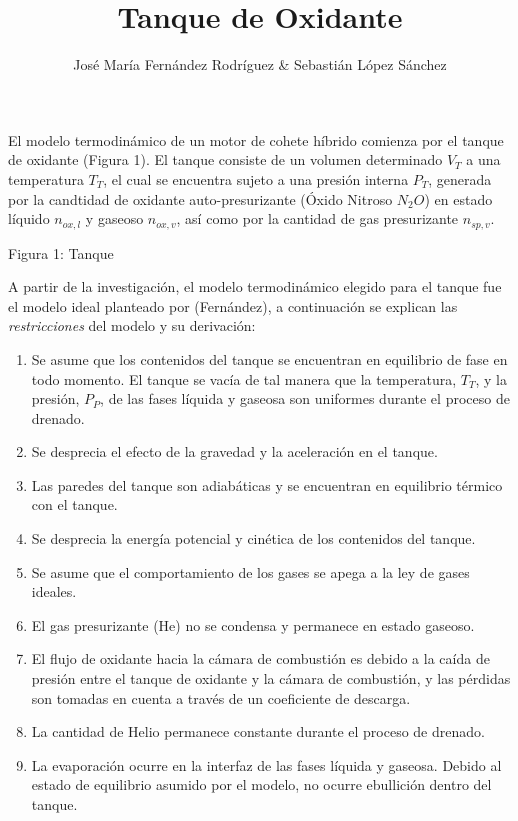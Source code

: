 \documentclass[12pt]{article}
\begin{document}

\title{Tanque de Oxidante}
\author{José María Fernández Rodríguez \& Sebastián López Sánchez}

\maketitle

El modelo termodinámico de un motor de cohete híbrido comienza por el tanque de oxidante (Figura 1). El tanque consiste de un volumen determinado $V_{T}$ a una temperatura $T_T$, el cual se encuentra sujeto a una presión interna $P_T$, generada por la candtidad de oxidante auto-presurizante (Óxido Nitroso $N_{2}O$) en estado líquido $n_{ox,l}$ y gaseoso $n_{ox,v}$, así como por la cantidad de gas presurizante $n_{sp,v}$. \par

Figura 1: Tanque \par

A partir de la investigación, el modelo termodinámico elegido para el tanque fue el modelo ideal planteado por (Fernández), a continuación se explican las \emph{restricciones} del modelo y su derivación:

\begin{enumerate}
    \item Se asume que los contenidos del tanque se encuentran en equilibrio de fase en todo momento. El tanque se vacía de tal manera que la temperatura, $T_T$, y la presión, $P_P$, de las fases líquida y gaseosa son uniformes durante el proceso de drenado.
    \item Se desprecia el efecto de la gravedad y la aceleración en el tanque.
    \item Las paredes del tanque son adiabáticas y se encuentran en equilibrio térmico con el tanque.
    \item Se desprecia la energía potencial y cinética de los contenidos del tanque.
    \item Se asume que el comportamiento de los gases se apega a la ley de gases ideales.
    \item El gas presurizante (He) no se condensa y permanece en estado gaseoso.
    \item El flujo de oxidante hacia la cámara de combustión es debido a la caída de presión entre el tanque de oxidante y la cámara de combustión, y las pérdidas son tomadas en cuenta a través de un coeficiente de descarga.
    \item La cantidad de Helio permanece constante durante el proceso de drenado.
    \item La evaporación ocurre en la interfaz de las fases líquida y gaseosa. Debido al estado de equilibrio asumido por el modelo, no ocurre ebullición dentro del tanque.
\end{enumerate}
\end{document}
